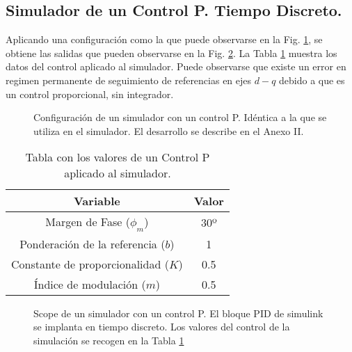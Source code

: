 \documentclass{report}
\begin{document}
\clearpage
\subsection{Simulador de un Control P. Tiempo Discreto.} \label{sec.simuladorcontrolP}

Aplicando una configuración como la que puede observarse en la Fig. \ref{fig.simulador_p}, se obtiene las salidas que pueden observarse en la Fig. \ref{fig.scope_simulador_p}. La Tabla \ref{tab.datossimuladorp} muestra los datos del control aplicado al simulador.
Puede observarse que existe un error en regimen permanente de seguimiento de referencias en ejes $d-q$ debido a que es un control proporcional, sin integrador.
\begin{figure}[!h]
    \centering
    \caption{Configuración de un simulador con un control P. Idéntica a la que se utiliza en el simulador. El desarrollo se describe en el Anexo II.}
    \label{fig.simulador_p}
\end{figure} 



\begin{table}[!h]
    \begin{center}
    \begin{tabular}{|c|c|} \hline\hline\hline
    \textbf{Variable} & \textbf{Valor} \\ \hline
    Margen de Fase ($\phi_{m}$) & 30º \\ \hline
    Ponderación de la referencia ($b$) & 1 \\ \hline 
    Constante de proporcionalidad ($K$) & 0.5 \\ \hline 
    Índice de modulación ($m$) & 0.5 \\ \hline
        
    \end{tabular}
    \end{center}
    \caption{Tabla con los valores de un Control P aplicado al simulador.} \label{tab.datossimuladorp}
\end{table}
\begin{figure}[!h]
    \centering
    \caption{Scope de un simulador con un control P. El bloque PID de simulink se implanta en tiempo discreto. Los valores del control de la simulación se recogen en la Tabla \ref{tab.datossimuladorp}}
    \label{fig.scope_simulador_p}
\end{figure} 
\end{document}
